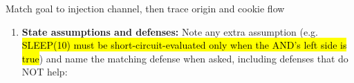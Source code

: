 \documentclass[12pt, a4paper]{article}
\newcommand{\imp}[1]{\hl{#1}}                       %
\begin{document}
\begin{schemebox}{Match goal to injection channel, then trace origin and cookie flow}
\begin{enumerate}[label=\textbf{Step \arabic*:}, leftmargin=*]
\begin{tightitem}
    \end{tightitem}
    \item \textbf{State assumptions and defenses:} Note any extra assumption (e.g. \imp{SLEEP(10) must be short-circuit-evaluated only when the AND's left side is true}) and name the matching defense when asked, including defenses that do NOT help:
\end{enumerate}
\end{schemebox}
\end{document}
